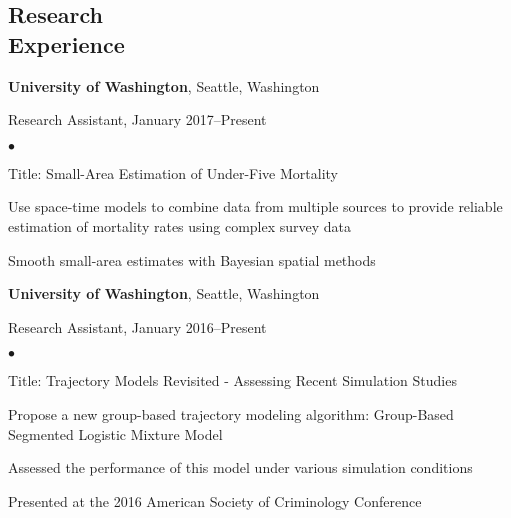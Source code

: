 \documentclass[margin,centered]{res}
\newenvironment{list1}{
  \begin{list}{\ding{113}}{%
      \setlength{\itemsep}{0in}
      \setlength{\parsep}{0in} \setlength{\parskip}{0in}
      \setlength{\topsep}{0in} \setlength{\partopsep}{0in}
      \setlength{\leftmargin}{0.17in}}}{\end{list}}
\newenvironment{list2}{
  \begin{list}{$\bullet$}{%
      \setlength{\itemsep}{0in}
      \setlength{\parsep}{0in} \setlength{\parskip}{0in}
      \setlength{\topsep}{0in} \setlength{\partopsep}{0in}
      \setlength{\leftmargin}{0.2in}}}{\end{list}}
\begin{document}
\begin{resume}
\section{\sc Research\\ Experience}

{\bf University of Washington},  Seattle, Washington
\begin{list1}
\item[] 
Research Assistant, January 2017--Present
\begin{list2}
\vspace*{.05in}
\item Title: Small-Area Estimation of Under-Five Mortality
\item Use space-time models to combine data from multiple sources to provide reliable estimation of mortality rates using complex survey data
\item Smooth small-area estimates with Bayesian spatial methods
\end{list2} 
\end{list1}

{\bf University of Washington},  Seattle, Washington
\begin{list1}
\item[] 
Research Assistant, January 2016--Present
\begin{list2}
\vspace*{.05in}
\item Title: Trajectory Models Revisited - Assessing Recent Simulation Studies
\item Propose a new group-based trajectory modeling algorithm: Group-Based Segmented Logistic Mixture Model
\item Assessed the performance of this model under various simulation conditions
\item Presented at the 2016 American Society of Criminology Conference 
\end{list2} 
\end{list1}





\end{resume}
\end{document}
